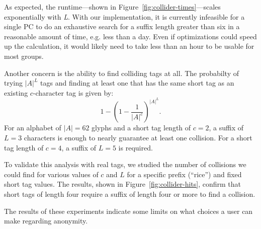 
As expected, the runtime---shown in
Figure~\ref{fig:collider-times}---scales exponentially with \textit{L}.
With our implementation, it is currently infeasible for a single PC to
do an exhaustive search for a suffix length greater than six in a
reasonable amount of time, e.g. less than a day. Even if optimizations
could speed up the calculation, it would likely need to take less than
an hour to be usable for most groups.  

Another concern is the ability to find colliding tags at all. The
probabilty of trying $|A|^L$ tags and finding at least one that has the
same short tag as an existing $c$-character tag is given by:
%
\[1-(1-\frac{1}{|A|^c})^{|A|^L}.\]
%
For an alphabet of $|A|=62$ glyphs and a short tag length of $c=2$, a
suffix of $L=3$ characters is enough to nearly guarantee at least one
collision. For a short tag length of $c=4$, a suffix of $L=5$ is
required.  

To validate this analysis with real tags, we studied the number of
collisions we could find for various values of $c$ and $L$ for a
specific prefix (``rice'') and fixed short tag values. The results,
shown in Figure~\ref{fig:collider-hits}, confirm that short tags of
length four require a suffix of length four or more to find a collision.


The results of these experiments indicate some limits on what choices a
user can make regarding anonymity.
%

